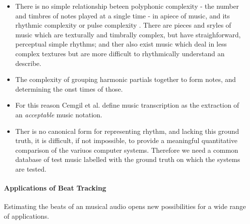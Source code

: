 \documentclass{scrartcl}
\begin{document}
\begin{itemize}
\item There is no simple relationship beteen polyphonic complexity - the number and timbres of notes played at a single time - in apiece of music, and its rhythmic complexity or pulse complexity \cite{Scheirer1998}. There are pieces and sryles of music which are texturally and timbrally complex, but have straighforward, perceptual simple rhythms; and ther also exist music which deal in less complex textures but are more difficult to rhythmically understand an describe.
\item The complexity of grouping harmonic partials together to form notes, and determining the onst times of those.
\item For this reason Cemgil et al. \cite{Cemgil2001} define music transcription as the extraction of an \emph{acceptable} music notation.
\item Ther is no canonical form for representing rhythm, and lacking this ground truth, it is difficult, if not impossible, to provide a meaningful quantitative comparison of the variuos computer systems. Therefore we need a common database of test music labelled with the ground truth on which the systems are tested. 
\end{itemize}





\paragraph{Applications of Beat Tracking}

Estimating the beats of an musical audio opens new possibilities for a wide range of applications. 
\end{document}
